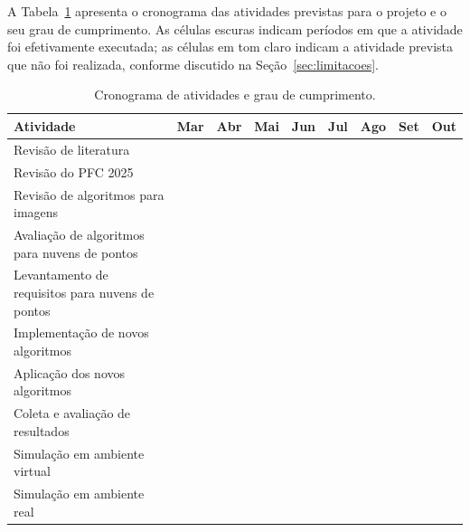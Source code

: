 \documentclass[
    12pt,
    openright,
    oneside,
    a4paper,
    english,
    brazil
]{abntex2}
\begin{document}
A Tabela~\ref{tab:cronograma} apresenta o cronograma das atividades previstas para o projeto e o seu grau de cumprimento. As células escuras indicam períodos em que a atividade foi efetivamente executada; as células em tom claro indicam a atividade prevista que não foi realizada, conforme discutido na Seção~\ref{sec:limitacoes}.

\begin{table}[H]
    \centering
    \caption{Cronograma de atividades e grau de cumprimento.}
    \label{tab:cronograma}
    \footnotesize
    \setlength{\tabcolsep}{4pt}
    \renewcommand{\arraystretch}{1.25}
    \begin{tabular}{|l|c|c|c|c|c|c|c|c|}
        \hline
        \textbf{Atividade} & \textbf{Mar} & \textbf{Abr} & \textbf{Mai} & \textbf{Jun} & \textbf{Jul} & \textbf{Ago} & \textbf{Set} & \textbf{Out} \\
        \hline
        Revisão de literatura
            & \cellcolor{cinzaExec} & & & & & & & \\
        \hline
        Revisão do PFC 2025
            & \cellcolor{cinzaExec} & \cellcolor{cinzaExec} & & & & & & \\
        \hline
        Revisão de algoritmos para imagens
            & \cellcolor{cinzaExec} & \cellcolor{cinzaExec} & & & & & & \\
        \hline
        Avaliação de algoritmos para nuvens de pontos
            & \cellcolor{cinzaExec} & \cellcolor{cinzaExec} & & & & & & \\
        \hline
        Levantamento de requisitos para nuvens de pontos
            & \cellcolor{cinzaExec} & \cellcolor{cinzaExec} & & & & & & \\
        \hline
        Implementação de novos algoritmos
            & & \cellcolor{cinzaExec} & \cellcolor{cinzaExec} & & & & & \\
        \hline
        Aplicação dos novos algoritmos
            & & & \cellcolor{cinzaExec} & \cellcolor{cinzaExec} & & & & \\
        \hline
        Coleta e avaliação de resultados
            & & & \cellcolor{cinzaExec} & \cellcolor{cinzaExec} & \cellcolor{cinzaExec} & & & \\
        \hline
        Simulação em ambiente virtual
            & & & & \cellcolor{cinzaExec} & \cellcolor{cinzaExec} & \cellcolor{cinzaExec} & \cellcolor{cinzaExec} & \\
        \hline
        Simulação em ambiente real
            & & & & & & & \cellcolor{cinzaPrev} & \cellcolor{cinzaPrev} \\

\end{tabular}
\end{table}
\end{document}
